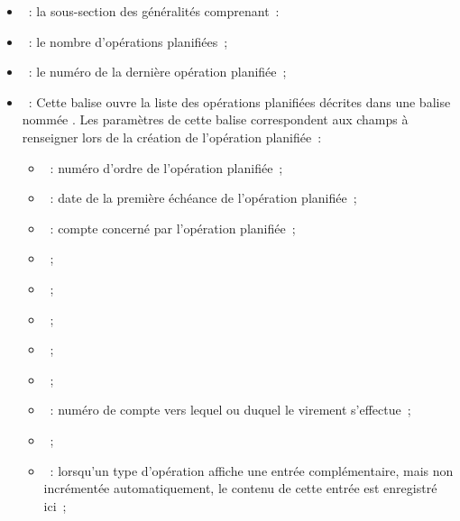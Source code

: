\begin{itemize}

\item {}~: la sous-section des généralités 
comprenant~:

\item {}~: le nombre d'opérations 
planifiées~;

\item {}~: le numéro de la 
dernière opération planifiée~;

\item {}~: Cette balise ouvre la liste
des opérations planifiées décrites dans une balise nommée 
. Les paramètres
de cette balise correspondent aux champs à renseigner lors de la création de 
l'opération planifiée~:

\begin{itemize}

\item {}~: numéro d'ordre de l'opération planifiée~;

\item {}~: date de la première échéance de l'opération 
planifiée~;

\item {}~: compte concerné par l'opération planifiée~;

\item {}~;

\item {}~;

\item {}~;

\item {}~;

\item {}~;

\item {}~: numéro de compte vers lequel ou duquel le virement
s'effectue~;

\item {}~;

\item {}~: lorsqu'un type d'opération affiche une entrée
complémentaire, mais non incrémentée automatiquement, le contenu de cette entrée 
est enregistré ici~;


\end{itemize}
\end{itemize}
